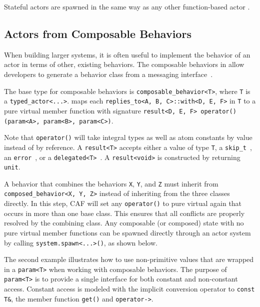 

Stateful actors are spawned in the same way as any other function-based actor .



\clearpage
\subsection{Actors from Composable Behaviors}
\label{composable-behavior}

When building larger systems, it is often useful to implement the behavior of an actor in terms of other, existing behaviors. The composable behaviors in \lib allow developers to generate a behavior class from a messaging interface~.

The base type for composable behaviors is \lstinline^composable_behavior<T>^, where \lstinline^T^ is a \lstinline^typed_actor<...>^. \lib maps each \lstinline^replies_to<A, B, C>::with<D, E, F>^ in \lstinline^T^ to a pure virtual member function with signature \lstinline^result<D, E, F> operator()(param<A>, param<B>, param<C>)^.

Note that \lstinline^operator()^ will take integral types as well as atom constants by value instead of by reference. A \lstinline^result<T>^ accepts either a value of type \lstinline^T^, a \lstinline^skip_t^~, an \lstinline^error^~, or a \lstinline^delegated<T>^~. A \lstinline^result<void>^ is constructed by returning \lstinline^unit^.

A behavior that combines the behaviors \lstinline^X^, \lstinline^Y^, and \lstinline^Z^ must inherit from \lstinline^composed_behavior<X, Y, Z>^ instead of inheriting from the three classes directly. In this step, CAF will set any \lstinline^operator()^ to pure virtual again that occurs in more than one base class. This ensures that all conflicts are properly resolved by the combining class. Any composable (or composed) state with no pure virtual member functions can be spawned directly through an actor system by calling \lstinline^system.spawn<...>()^, as shown below.



\clearpage
The second example illustrates how to use non-primitive values that are wrapped in a \lstinline^param<T>^ when working with composable behaviors. The purpose of \lstinline^param<T>^ is to provide a single interface for both constant and non-constant access. Constant access is modeled with the implicit conversion operator to \lstinline^const T&^, the member function \lstinline^get()^ and \lstinline^operator->^. 

